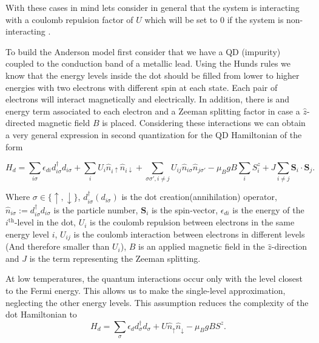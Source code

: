 
With these cases in mind lets consider in general that the system is interacting with a coulomb repulsion factor of $U$ which will be set to $0$ if the system is non-interacting . 


To build the Anderson model first consider that we have a QD (impurity) coupled to the conduction band of a metallic lead.
Using the Hunds rules we know that the energy levels inside the dot should be filled from lower to higher energies with two electrons with different spin at each state. Each pair of electrons will interact magnetically and electrically. In addition, there is and energy term associated to each electron and a Zeeman splitting factor in case a $\hat{z}$-directed magnetic field $B$ is placed.  Considering these interactions we can obtain a very general expression in second quantization for the QD Hamiltonian
of the form \citep[(3.2)]{sindel_numerical_2005}

\[
H_{d}=\sum_{i\sigma}\epsilon_{di}d_{i\sigma}^{\dagger}d_{i\sigma}+\sum_{i}U_{i}\hat{n}_{i\uparrow}\hat{n}_{i\downarrow}+\sum_{\sigma\sigma',i\neq j}U_{ij}\hat{n}_{i\sigma}\hat{n}_{j\sigma'}-\mu_{B}gB\sum_{i}S_{i}^{z}+J\sum_{i\neq j}\mathbf{S}_{i}\cdot\mathbf{S}_{j}.
\]


Where $\sigma\in\{\uparrow,\downarrow\}$, $d_{i\sigma}^{\dagger}\left(d_{i\sigma}\right)$
is the dot creation(annihilation) operator,$\hat{n}_{i\sigma}:=d_{i\sigma}^{\dagger}d_{i\sigma}$
is the particle number, $\mathbf{S}_{i}$ is the spin-vector, $\epsilon_{di}$
is the energy of the $i^{\mbox{th}}$-level in the dot, $U_{i}$ is
the coulomb repulsion between electrons in the same energy level $i$,
$U_{ij}$ is the coulomb interaction between electrons in different
levels (And therefore smaller than $U_{i}$), \textbf{$B$} is an
applied magnetic field in the $\hat{z}$-direction and $J$ is the
term representing the Zeeman splitting. 

At low temperatures, the quantum interactions occur only with the level closest to the Fermi energy. This allows us to make the single-level approximation, neglecting the other energy levels. This assumption reduces the complexity of the dot Hamiltonian to \\


\begin{equation}
    H_{d}=\sum_{\sigma}\epsilon_{d}d_{\sigma}^{\dagger}d_{\sigma}+U\hat{n}_{\uparrow}\hat{n}_{\downarrow}-\mu_{B}gBS^{z}. \label{eq:hdot}
\end{equation}

